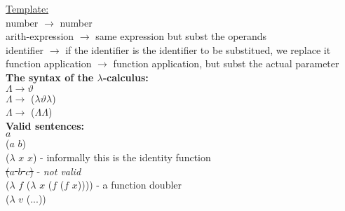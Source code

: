 \documentclass{article}
\begin{document}
\begin{flushleft}
\underline{Template:}\\
number $\rightarrow$ number\\
arith-expression $\rightarrow$ same expression but subst the operands\\
identifier $\rightarrow$ if the identifier is the identifier to be substitued, we replace it\\
function application $\rightarrow$ function application, but subst the actual parameter\\
\doublespacing
\textbf{The syntax of the $\lambda$-calculus:}\\
$\Lambda \rightarrow \vartheta$ \\
$\Lambda \rightarrow$ ($\lambda \vartheta \lambda$)\\
$\Lambda \rightarrow$ ($\Lambda \Lambda$)\\
\textbf{Valid sentences:}\\
$\mathit{a}$\\
($\mathit{a}$ $\mathit{b}$)\\
($\lambda$ $\mathit{x}$ $\mathit{x}$) - informally this is the identity function\\
\sout{($\mathit{a}$ $\mathit{b}$ $\mathit{c}$)} - \textit{not valid}\\
($\lambda$ $\mathit{f}$ ($\lambda$ $\mathit{x}$ ($\mathit{f}$ ($\mathit{f}$ $\mathit{x}$)))) - a function doubler\\
($\lambda$ $\mathit{v}$ ($\mathit{...}$))
\end{flushleft}
\end{document}

